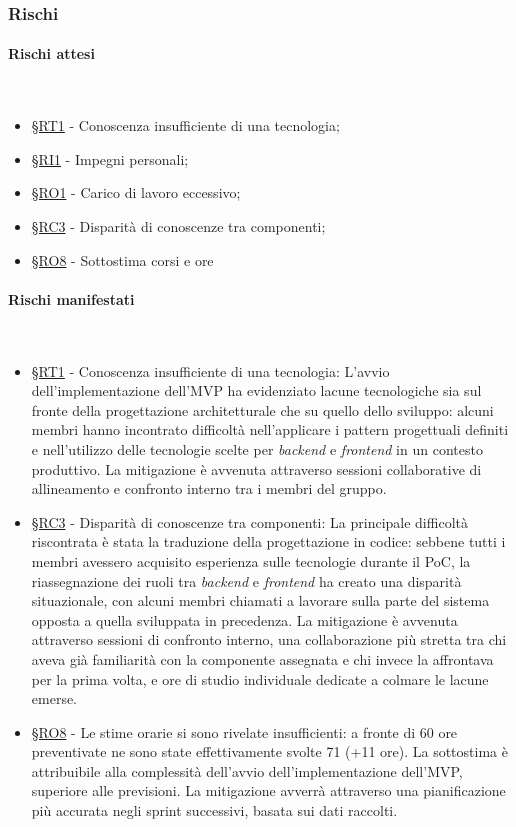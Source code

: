 \documentclass[10pt, letterpaper]{article}
\newcommand{\trisubsection}[1]{\paragraph{#1}\mbox{}\\}
\newcommand{\rif}[1]{\hyperref[#1]{§#1}}
\begin{document}
    \subsubsection{Rischi}
    \trisubsection{Rischi attesi}
    \begin{itemize}
    \item \rif{RT1} - Conoscenza insufficiente di una tecnologia;
    \item \rif{RI1} - Impegni personali;
    \item \rif{RO1} - Carico di lavoro eccessivo;
    \item \rif{RC3} - Disparità di conoscenze tra componenti;
    \item \rif{RO8} - Sottostima corsi e ore 
    \end{itemize}
    \trisubsection{Rischi manifestati}
    \begin{itemize}
        \item \rif{RT1} - Conoscenza insufficiente di una tecnologia: L'avvio dell'implementazione dell'MVP ha evidenziato lacune tecnologiche sia sul fronte della progettazione architetturale che su quello dello sviluppo: alcuni membri hanno incontrato difficoltà nell'applicare i pattern progettuali definiti e nell'utilizzo delle tecnologie scelte per \textit{backend} e \textit{frontend} in un contesto produttivo. La mitigazione è avvenuta attraverso sessioni collaborative di allineamento e confronto interno tra i membri del gruppo.
        \item \rif{RC3} - Disparità di conoscenze tra componenti: La principale difficoltà riscontrata è stata la traduzione della progettazione in codice: sebbene tutti i membri avessero acquisito esperienza sulle tecnologie durante il PoC, la riassegnazione dei ruoli tra \textit{backend} e \textit{frontend} ha creato una disparità situazionale, con alcuni membri chiamati a lavorare sulla parte del sistema opposta a quella sviluppata in precedenza. La mitigazione è avvenuta attraverso sessioni di confronto interno, una collaborazione più stretta tra chi aveva già familiarità con la componente assegnata e chi invece la affrontava per la prima volta, e ore di studio individuale dedicate a colmare le lacune emerse.
        \item \rif{RO8} - Le stime orarie si sono rivelate insufficienti: a fronte di 60 ore preventivate ne sono state effettivamente svolte 71 (+11 ore). La sottostima è attribuibile alla complessità dell'avvio dell'implementazione dell'MVP, superiore alle previsioni. La mitigazione avverrà attraverso una pianificazione più accurata negli sprint successivi, basata sui dati raccolti.
    \end{itemize}
\end{document}
